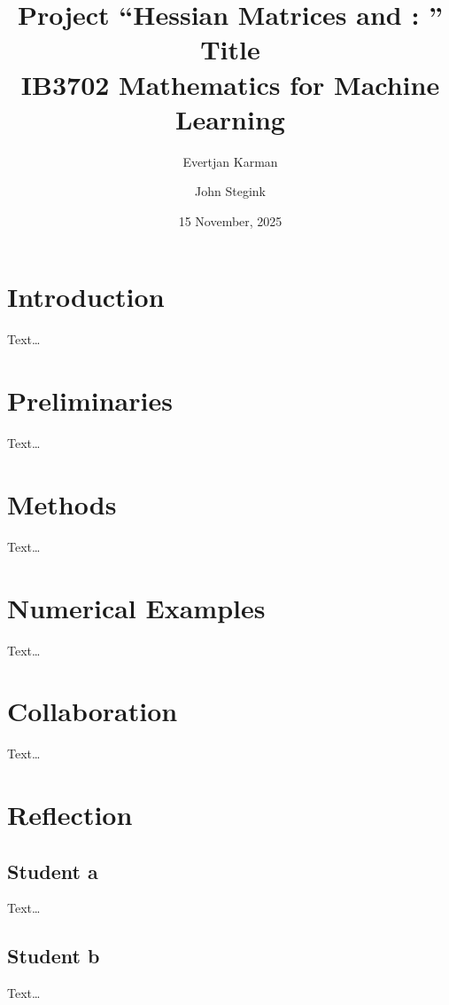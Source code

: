 \documentclass[11pt, a4paper]{article}
\title{Project ``Hessian Matrices and : '' \\
	{Title} \\ 
	IB3702 Mathematics for Machine Learning} %
\author{Evertjan Karman \and John Stegink} %
\date{15 November, 2025} %
\begin{document}
\maketitle

\section{Introduction}

Text\ldots

\section{Preliminaries}

Text\ldots


\section{Methods}

Text\ldots

\section{Numerical Examples}

Text\ldots

\section{Collaboration}

Text\ldots

\section{Reflection}

\subsection{Student a}

Text\ldots

\subsection{Student b}

Text\ldots
\end{document}
